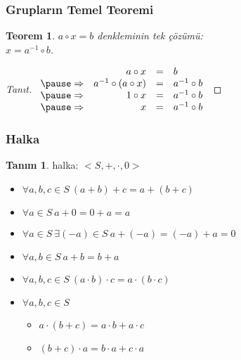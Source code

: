 \documentclass[dvipsnames]{beamer}
\theoremstyle{definition}
\newtheorem{tanim}[theorem]{Tanım}
\theoremstyle{example}
\theoremstyle{plain}
\newtheorem{teorem}[theorem]{Teorem}
\begin{document}
\begin{frame}
  \frametitle{Grupların Temel Teoremi}

  \begin{teorem}
    $a \circ x = b$ denkleminin tek çözümü:\\
    $x = a^{-1} \circ b$.
  \end{teorem}

  \pause
  \begin{proof}[Tanıt]
    $\begin{array}{crcl}
                & a \circ x                & = & b\\\pause
    \Rightarrow & a^{-1} \circ (a \circ x) & = & a^{-1} \circ b\\\pause
    \Rightarrow & 1 \circ x                & = & a^{-1} \circ b\\\pause
    \Rightarrow & x                        & = & a^{-1} \circ b
    \end{array}$
  \end{proof}
\end{frame}

\begin{frame}
  \frametitle{Halka}

  \begin{tanim}
    \alert{halka}: $<S,+,\cdot,0>$

    \begin{itemize}
      \item $\forall a,b,c \in S~(a + b) + c = a + (b + c)$
      \item $\forall a \in S~a + 0 = 0 + a = a$
      \item $\forall a \in S~\exists (-a) \in S~a + (-a) = (-a) + a = 0$
      \item $\forall a,b \in S~a + b = b + a$

      \pause
      \item $\forall a,b,c \in S~(a \cdot b) \cdot c = a \cdot (b \cdot c)$

      \pause
      \item $\forall a,b,c \in S$
      \begin{itemize}
        \item $a \cdot (b + c) = a \cdot b + a \cdot c$
        \item $(b + c) \cdot a = b \cdot a + c \cdot a$
      \end{itemize}
    \end{itemize}
  \end{tanim}
\end{frame}
\end{document}
